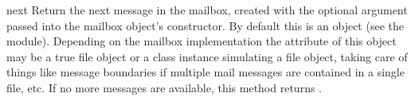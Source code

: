 \begin{methoddesc}[mailbox]{next}{}
Return the next message in the mailbox, created with the optional
 argument passed into the mailbox object's constructor.
By default this is an 
object (see the  module).  Depending on the mailbox
implementation the  attribute of this object may be a true
file object or a class instance simulating a file object, taking care
of things like message boundaries if multiple mail messages are
contained in a single file, etc.  If no more messages are available,
this method returns .
\end{methoddesc}
